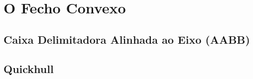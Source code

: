 \chapter{O Fecho Convexo}

\section{Caixa Delimitadora Alinhada ao Eixo (AABB)}

\section{Quickhull}
